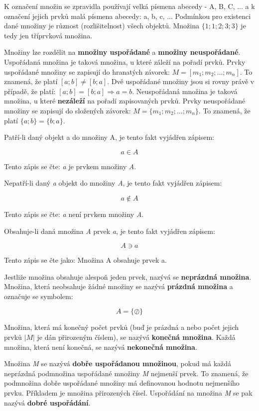 K označení množin se zpravidla používají velká písmena abecedy - A, B, C, ... a k označení jejich prvků malá písmena abecedy: a, b, c, ... Podmínkou pro existenci dané množiny je různost (rozlišitelnost) všech objektů. Množina $\{1; 1; 2; 3; 3\}$ je tedy jen tříprvková množina.

Množiny lze rozdělit na {\bf množiny uspořádané} a {\bf množiny neuspořádané}. Uspořádaná množina je taková množina, u které záleží na pořadí prvků. Prvky uspořádané množiny se zapisují do hranatých závorek: $M = [m_1; m_2; ...; m_n ]$. To znamená, že platí $[a; b] \neq [b;a]$. Dvě uspořádané množiny jsou si rovny právě v případě, že platí: $[a; b] = [b; a] \Rightarrow a = b$. Neuspořádaná množina je taková množina, u které {\bf nezáleží} na pořadí zapisovaných prvků. Prvky neuspořádané množiny se zapisují do složených závorek: $M = \{m_1; m_2; ...; m_n\}$. To znamená, že platí $\{a; b\} = \{b; a\}$.

Patří-li daný objekt a do množiny A, je tento fakt vyjádřen zápisem:

$$ a \in A $$

Tento zápis se čte: {\it a} je prvkem množiny {\it A}.

Nepatří-li daný {\it a} objekt do množiny {\it A}, je tento fakt vyjádřen zápisem:

$$ a \notin A $$

Tento zápis se čte: {\it a} není prvkem množiny {\it A}.

Obsahuje-li daná množina {\it A} prvek {\it a}, je tento fakt vyjádřen zápisem:

$$ A \ni a $$

Tento zápis se čte jako: Množina A obsahuje prvek a.

Jestliže množina obsahuje alespoň jeden prvek, nazývá se {\bf neprázdná množina}. 
Množina, která neobsahuje žádné množiny se nazývá {\bf prázdná množina} a označuje se symbolem:

$$ A=\{ \oslash \}$$

Množina, která má konečný počet prvků (buď je prázdná a nebo počet jejich prvků $|M|$ je dán přirozeným číslem), se nazývá {\bf konečná množina}. 
Každá množina, která není konečná, se nazývá {\bf nekonečná množina}.



Množina {\it M} se nazývá {\bf dobře uspořádanou množinou}, pokud má každá neprázdná podmnožina uspořádané množiny {\it M} nejmenší prvek. To znamená, že podmnožina dobře uspořádané množiny má definovanou hodnotu nejmenšího prvku. Příkladem je množina přirozených čísel. Uspořádání na množina {\it M} se pak nazývá {\bf dobré uspořádání}.

